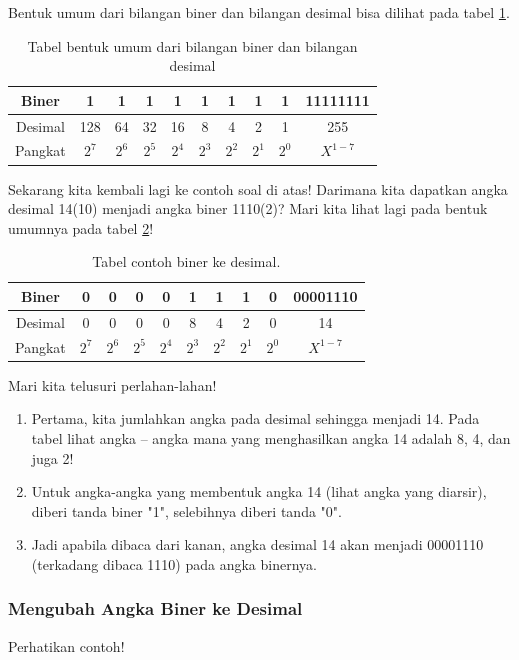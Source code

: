 Bentuk umum dari bilangan biner dan bilangan desimal bisa dilihat pada tabel \ref{table:binerdesimal}.

\begin{table}[h!]
\centering
\begin{tabular}{ |c|c|c|c|c|c|c|c|c|c| }
\hline
Biner & 1 & 1 & 1 & 1 & 1 & 1 & 1 & 1 & 11111111 \\
\hline
Desimal & 128 & 64 & 32 & 16 & 8 & 4 & 2 & 1 & 255 \\
\hline
Pangkat & $2^7$ & $2^6$ & $2^5$ & $2^4$ & $2^3$ & $2^2$ & $2^1$ & $2^0$ & $X^{1-7}$ \\
\hline
\end{tabular}
\caption{Tabel bentuk umum dari bilangan biner dan bilangan desimal}
\label{table:binerdesimal}
\end{table}

Sekarang kita kembali lagi ke contoh soal di atas! Darimana kita dapatkan angka desimal 14(10) menjadi angka biner 1110(2)?
Mari kita lihat lagi pada bentuk umumnya pada tabel \ref{table:contoh1}!

\begin{table}[h!]
\centering
\begin{tabular}{ |c|c|c|c|c|c|c|c|c|c| }
\hline
Biner & 0 & 0 & 0 & 0 & 1 & 1 & 1 & 0 & 00001110 \\
\hline
Desimal & 0 & 0 & 0 & 0 & 8 & 4 & 2 & 0 & 14 \\
\hline
Pangkat & $2^7$ & $2^6$ & $2^5$ & $2^4$ & $2^3$ & $2^2$ & $2^1$ & $2^0$ & $X^{1-7}$ \\
\hline
\end{tabular}
\caption{Tabel contoh biner ke desimal.}
\label{table:contoh1}
\end{table}

\noindent Mari kita telusuri perlahan-lahan!

\begin{enumerate}[label=(\alph*)]
\item Pertama, kita jumlahkan angka pada desimal sehingga menjadi 14. Pada tabel lihat angka – angka mana yang menghasilkan angka 14 adalah 8, 4, dan juga 2!
\item Untuk angka-angka yang membentuk angka 14 (lihat angka yang diarsir), diberi tanda biner "1", selebihnya diberi tanda "0".
\item Jadi apabila dibaca dari kanan, angka desimal 14 akan menjadi 00001110 (terkadang dibaca 1110) pada angka binernya.
\end{enumerate}


\subsubsection{Mengubah Angka Biner ke Desimal}
Perhatikan contoh!

